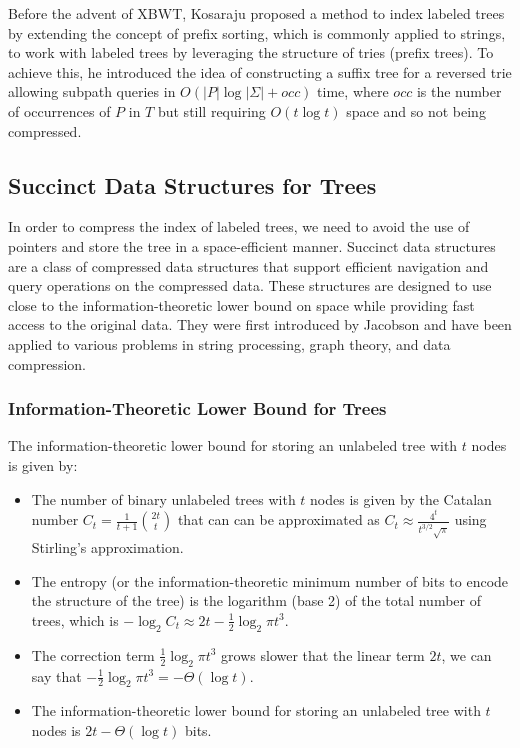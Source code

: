 Before the advent of XBWT, Kosaraju \cite{kosaraju1989efficient} proposed a method to index labeled trees by extending the concept of prefix sorting, which is commonly applied to strings, to work with labeled trees by leveraging the structure of tries (prefix trees). To achieve this, he introduced the idea of constructing a suffix tree for a reversed trie allowing subpath queries in $O(|P|\log|\Sigma|+ occ)$ time, where $occ$ is the number of occurrences of $P$ in $T$ but still requiring $O(t \log t)$ space and so not being compressed.

\subsection{Succinct Data Structures for Trees}
In order to compress the index of labeled trees, we need to avoid the use of pointers and store the tree in a space-efficient manner. Succinct data structures are a class of compressed data structures that support efficient navigation and query operations on the compressed data. These structures are designed to use close to the information-theoretic lower bound on space while providing fast access to the original data. They were first introduced by Jacobson \cite{jacobson1989space} and have been applied to various problems in string processing, graph theory, and data compression.

\subsubsection{Information-Theoretic Lower Bound for Trees}
The information-theoretic lower bound for storing an unlabeled tree with $t$ nodes is given by:

\begin{itemize}
    \item The number of binary unlabeled trees with $t$ nodes is given by the Catalan number $C_t = \frac{1}{t+1} \binom{2t}{t}$ that can can be approximated as $C_t \approx \frac{4^t}{t^{3/2}\sqrt{\pi}}$ using Stirling's approximation.
    \item The entropy (or the information-theoretic minimum number of bits to encode the structure of the tree) is the logarithm (base 2) of the total number of trees, which is $-\log_2 C_t \approx 2t - \frac{1}{2} \log_2 \pi t^3$.
    \item The correction term $\frac{1}{2} \log_2 \pi t^3$ grows slower that the linear term $2t$, we can say that $-\frac{1}{2} \log_2 \pi t^3 = -\Theta(\log t)$.
    \item The information-theoretic lower bound for storing an unlabeled tree with $t$ nodes is $2t - \Theta(\log t)$ bits.
\end{itemize}

